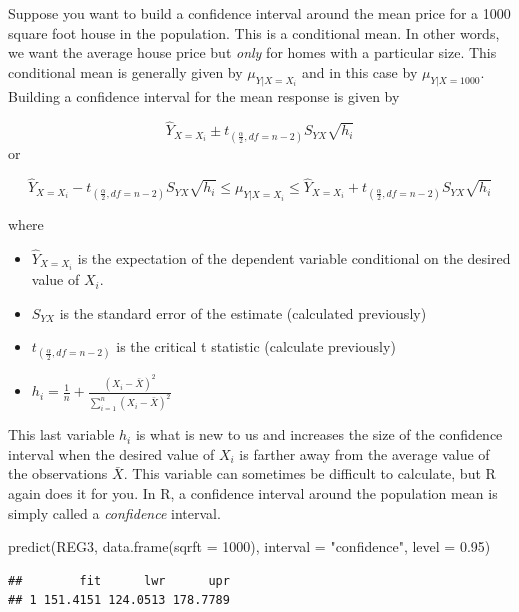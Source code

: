 \documentclass[
]{book}
\newenvironment{Shaded}{\begin{snugshade}}{\end{snugshade}}
\newcommand{\AttributeTok}[1]{\textcolor[rgb]{0.77,0.63,0.00}{#1}}
\newcommand{\DecValTok}[1]{\textcolor[rgb]{0.00,0.00,0.81}{#1}}
\newcommand{\FloatTok}[1]{\textcolor[rgb]{0.00,0.00,0.81}{#1}}
\newcommand{\FunctionTok}[1]{\textcolor[rgb]{0.00,0.00,0.00}{#1}}
\newcommand{\NormalTok}[1]{#1}
\newcommand{\StringTok}[1]{\textcolor[rgb]{0.31,0.60,0.02}{#1}}
\begin{document}
Suppose you want to build a confidence interval around the mean price for a 1000 square foot house in the population. This is a conditional mean. In other words, we want the average house price but \emph{only} for homes with a particular size. This conditional mean is generally given by \(\mu_{Y|X=X_i}\) and in this case by \(\mu_{Y|X=1000}\). Building a confidence interval for the mean response is given by

\[ \hat{Y}_{X=X_i} \pm t_{(\frac{\alpha}{2},df=n-2)}S_{YX} \sqrt{h_i}\]
or

\[ \hat{Y}_{X=X_i} - t_{(\frac{\alpha}{2},df=n-2)}S_{YX} \sqrt{h_i} \leq \mu_{Y|X=X_i} \leq \hat{Y}_{X=X_i} + t_{(\frac{\alpha}{2},df=n-2)}S_{YX} \sqrt{h_i}\]

where

\begin{itemize}
\item
  \(\hat{Y}_{X=X_i}\) is the expectation of the dependent variable conditional on the desired value of \(X_i\).
\item
  \(S_{YX}\) is the standard error of the estimate (calculated previously)
\item
  \(t_{(\frac{\alpha}{2},df=n-2)}\) is the critical t statistic (calculate previously)
\item
  \(h_i = \frac{1}{n}+\frac{(X_i - \bar{X})^2}{\sum_{i=1}^n(X_i - \bar{X})^2}\)
\end{itemize}

This last variable \(h_i\) is what is new to us and increases the size of the confidence interval when the desired value of \(X_i\) is farther away from the average value of the observations \(\bar{X}\). This variable can sometimes be difficult to calculate, but R again does it for you. In R, a confidence interval around the population mean is simply called a \emph{confidence} interval.

\begin{Shaded}
\begin{Highlighting}[]
\FunctionTok{predict}\NormalTok{(REG3,}
        \FunctionTok{data.frame}\NormalTok{(}\AttributeTok{sqrft =} \DecValTok{1000}\NormalTok{), }
        \AttributeTok{interval =} \StringTok{"confidence"}\NormalTok{,}
        \AttributeTok{level =} \FloatTok{0.95}\NormalTok{)}
\end{Highlighting}
\end{Shaded}

\begin{verbatim}
##        fit      lwr      upr
## 1 151.4151 124.0513 178.7789
\end{verbatim}
\end{document}
